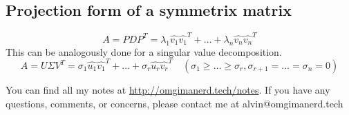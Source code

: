 \documentclass{math}
\begin{document}
\subsection*{Projection form of a symmetrix matrix}
\[ A = PDP^T = \lambda_1\hat{v_1}\hat{v_1}^T+\dots+
  \lambda_n\hat{v_n}\hat{v_n}^T \]
This can be analogously done for a singular value decomposition.
\[ A = U\Sigma V^T = \sigma_1\hat{u_1}\hat{v_1}^T+\dots+
  \sigma_r\hat{u_r}\hat{v_r}^T \quad (\sigma_1\ge\dots\ge\sigma_r,
  \sigma_{r+1} = \dots = \sigma_n = 0) \]

\begin{center}
  You can find all my notes at \url{http://omgimanerd.tech/notes}. If you have
  any questions, comments, or concerns, please contact me at
  alvin@omgimanerd.tech
\end{center}
\end{document}
